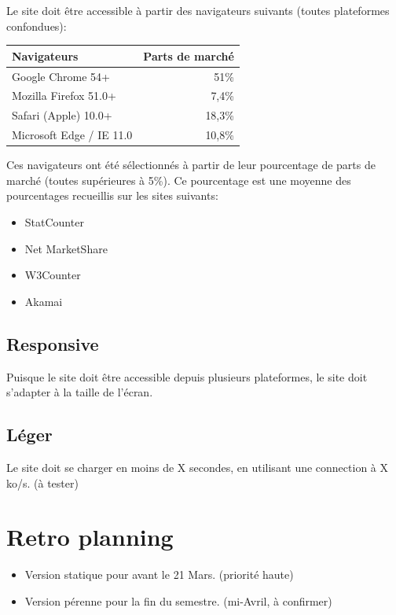 \documentclass[11pt]{report}
\begin{document}
Le site doit être accessible à partir des navigateurs suivants (toutes plateformes confondues):
\begin{center}
	\begin{tabular}{|l | r|}
		\hline
		Navigateurs & Parts de marché \\
		\hline
		\hline
		Google Chrome 54+ & 51\%  \\
		\hline
		Mozilla Firefox 51.0+ & 7,4\% \\
		\hline
		Safari (Apple) 10.0+ & 18,3\% \\
		\hline
		Microsoft Edge / IE 11.0 & 10,8\% \\
		\hline
	\end{tabular}
\end{center}
Ces navigateurs ont été sélectionnés à partir de leur pourcentage de parts de marché (toutes supérieures à 5\%). Ce pourcentage est une moyenne des pourcentages recueillis sur les sites suivants:
\begin{itemize}
	\item StatCounter
	\item Net MarketShare
	\item W3Counter
	\item Akamai
\end{itemize}

\subsection*{Responsive}
Puisque le site doit être accessible depuis plusieurs plateformes, le site doit s'adapter à la taille de l'écran.

\subsection*{Léger}
Le site doit se charger en moins de X secondes, en utilisant une connection à
X ko/s. (à tester)


\section{Retro planning}

\begin{itemize}
	\item Version statique pour avant le 21 Mars. (priorité haute)
	\item Version pérenne pour la fin du semestre. (mi-Avril, à confirmer)
\end{itemize}
\end{document}
